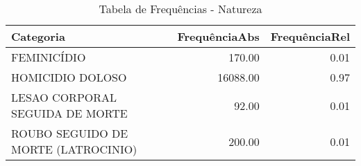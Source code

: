 \begin{table}[ht]
\centering
\begin{tabular}{lrr}
  \hline
Categoria & FrequênciaAbs & FrequênciaRel \\ 
  \hline
FEMINICÍDIO & 170.00 & 0.01 \\ 
  HOMICIDIO DOLOSO & 16088.00 & 0.97 \\ 
  LESAO CORPORAL SEGUIDA DE MORTE & 92.00 & 0.01 \\ 
  ROUBO SEGUIDO DE MORTE (LATROCINIO) & 200.00 & 0.01 \\ 
   \hline
\end{tabular}
\caption{Tabela de Frequências - Natureza} 
\end{table}
